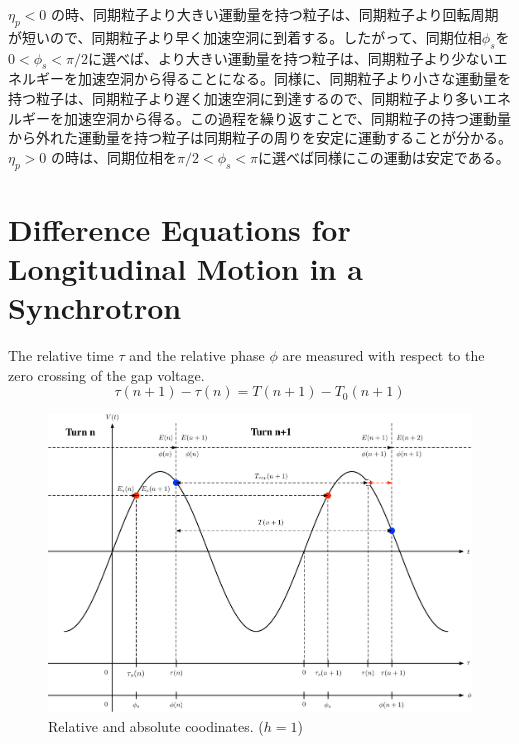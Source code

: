 \documentclass[10pt,a4paper]{ltjsarticle}
\begin{document}
$\eta_p < 0$ の時、同期粒子より大きい運動量を持つ粒子は、同期粒子より回転周期が短いので、同期粒子より早く加速空洞に到着する。したがって、同期位相$\phi_s$を$0<\phi_s<\pi/2$に選べば、より大きい運動量を持つ粒子は、同期粒子より少ないエネルギーを加速空洞から得ることになる。同様に、同期粒子より小さな運動量を持つ粒子は、同期粒子より遅く加速空洞に到達するので、同期粒子より多いエネルギーを加速空洞から得る。この過程を繰り返すことで、同期粒子の持つ運動量から外れた運動量を持つ粒子は同期粒子の周りを安定に運動することが分かる。$\eta_p > 0$ の時は、同期位相を$\pi/2<\phi_s<\pi$に選べば同様にこの運動は安定である。

\section{Difference Equations for Longitudinal Motion in a Synchrotron}
The relative time $\tau$ and the relative phase $\phi$ are measured with respect to the zero crossing of the gap voltage. 
%
\begin{equation}
    \tau(n+1) - \tau(n) = T(n+1) -T_0(n+1)
\end{equation}
%
\begin{figure}[hhbt]
    \begin{center}
      \includegraphics[width=15cm,clip]{coordinates.pdf}
      \caption{Relative and absolute coodinates. ($h=1$)}
      \label{coordinates}
    \end{center}
\end{figure}
\end{document}
